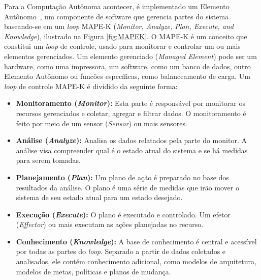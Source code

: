 \documentclass[portugues]{ic-tese}
\begin{document}
Para a Computação Autônoma acontecer, é implementado um Elemento Autônomo~\citep{Abbas_2010}, um componente de software que gerencia partes do sistema baseando-se em um \textit{loop} MAPE-K (\textit{Monitor, Analyze, Plan, Execute, and Knowledge}), ilustrado na Figura \ref{fig:MAPEK}. O MAPE-K é um conceito que constitui um \textit{loop} de controle, usado para monitorar e controlar um ou mais elementos gerenciados. Um elemento gerenciado (\textit{Managed Element}) pode ser um hardware, como uma impressora, um software, como um banco de dados, outro Elemento Autônomo ou funcões específicas, como balanceamento de carga. Um \textit{loop} de controle MAPE-K é dividido da seguinte forma:

\begin{itemize}
\item \textbf{Monitoramento (\textit{Monitor}):} Esta parte é responsável por monitorar os recursos gerenciados e coletar, agregar e filtrar dados. O monitoramento é feito por meio de um sensor (\textit{Sensor}) ou mais sensores.
\item \textbf{Análise (\textit{Analyze}):} Analisa os dados relatados pela parte do monitor. A análise visa compreender qual é o estado atual do sistema e se há medidas para serem tomadas.
\item \textbf{Planejamento (\textit{Plan}):} Um plano de ação é preparado no
base dos resultados da análise. O plano é uma série de medidas que irão mover o sistema de seu estado atual para um estado desejado.
\item \textbf{Execução (\textit{Execute}):} O plano é executado e controlado.
Um efetor (\textit{Effector}) ou mais executam as ações planejadas no recurso.
\item \textbf{Conhecimento (\textit{Knowledge}):} A base de conhecimento é central e acessível por todas as partes do \textit{loop}. Separado a partir de dados coletados e analisados, ele contém conhecimento adicional, como modelos de arquitetura, modelos de metas, políticas e planos de mudança.
\end{itemize}
\end{document}
